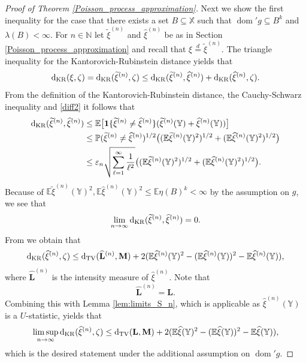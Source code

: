 \documentclass{article}
\theoremstyle{definition}
\numberwithin{equation}{section}
\theoremstyle{remark}
\newcommand{\E}{\mathbb{E}}
\begin{document}
\begin{proof}[Proof of Theorem \ref{Poisson_process_approximation}]
Next we show the first inequality for the case that there exists a set $B\subseteq \mathbb{X}$ such that $\operatorname{dom}' g\subseteq B^k$ and $\lambda(B)<\infty$. For $n\in\mathbb{N}$ let $\widetilde{\xi}^{(n)}$ and $\widehat{\xi}^{(n)}$ be as in Section \ref{Poisson_process_approximation} and recall that $\xi\overset{d}{=}\widetilde{\xi}^{(n)}$. The triangle inequality for the Kantorovich-Rubinstein distance yields that
$$
\mathrm{d}_{\rm KR}(\xi,\zeta)=\mathrm{d}_{\rm KR}(\widetilde{\xi}^{(n)},\zeta) \leq \mathrm{d}_{\rm KR}(\widetilde{\xi}^{(n)},\widehat{\xi}^{(n)}) + \mathrm{d}_{\rm KR}(\widehat{\xi}^{(n)},\zeta).
$$
From the definition of the Kantorovich-Rubinstein distance, the Cauchy-Schwarz inequality and \eqref{diff2} it follows that
\begin{align*}
	\mathrm{d}_{\rm KR}(\widetilde{\xi}^{(n)},\widehat{\xi}^{(n)}) & \leq \E\big[ \mathbf{1}\{ \widetilde{\xi}^{(n)}\neq\widehat{\xi}^{(n)} \} (\widetilde{\xi}^{(n)}(\mathbb{Y})+\widehat{\xi}^{(n)}(\mathbb{Y})) \big] \\
& \leq \mathbb{P}( \widetilde{\xi}^{(n)}\neq\widehat{\xi}^{(n)} )^{1/2} \big( (\E \widetilde{\xi}^{(n)}(\mathbb{Y})^2)^{1/2} + (\E \widehat{\xi}^{(n)}(\mathbb{Y})^2)^{1/2} \big) \\
& \leq \varepsilon_n \sqrt{\sum_{\ell=1}^\infty \frac{1}{\ell^2} } \big( (\E \widetilde{\xi}^{(n)}(\mathbb{Y})^2)^{1/2} + (\E \widehat{\xi}^{(n)}(\mathbb{Y})^2)^{1/2} \big).
\end{align*}
Because of $\E \widetilde{\xi}^{(n)}(\mathbb{Y})^2, \E \widehat{\xi}^{(n)}(\mathbb{Y})^2 \leq \E \eta(B)^k<\infty$ by the assumption on $g$, we see that
$$
\lim_{n\to\infty} \mathrm{d}_{\rm KR}(\widetilde{\xi}^{(n)},\widehat{\xi}^{(n)})=0.
$$
From \cite[Theorem 3.1]{dst} we obtain that
$$
\mathrm{d}_{\rm KR}(\widehat{\xi}^{(n)},\zeta) \leq \mathrm{d}_{\rm TV}(\widehat{\mathbf{L}}^{(n)},\mathbf{M}) + 2 (\E \widehat{\xi}^{(n)}(\mathbb{Y})^2 - (\E \widehat{\xi}^{(n)}(\mathbb{Y}))^2 - \E \widehat{\xi}^{(n)}(\mathbb{Y}) ),
$$
where $\widehat{\mathbf{L}}^{(n)}$ is the intensity measure of $\widehat{\xi}^{(n)}$. Note that
$$
\widehat{\mathbf{L}}^{(n)} = \mathbf{L}.
$$
Combining this with Lemma \ref{lem:limits_S_n}, which is applicable as $\widehat{\xi}^{(n)}(\mathbb{Y})$ is a $U$-statistic, yields that
$$
\limsup_{n\to\infty} \mathrm{d}_{\rm KR}(\widehat{\xi}^{(n)},\zeta) \leq \mathrm{d}_{\rm TV}(\mathbf{L},\mathbf{M}) + 2 (\E \widehat{\xi}(\mathbb{Y})^2 - (\E \widehat{\xi}(\mathbb{Y}))^2 - \E \widehat{\xi}(\mathbb{Y}) ),
$$
which is the desired statement under the additional assumption on $\operatorname{dom}'g$.


\end{proof}
\end{document}

